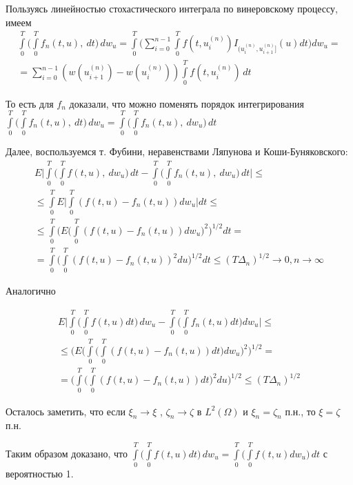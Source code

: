 \documentclass[12pt]{article}
\begin{document}
Пользуясь линейностью стохастического интеграла по винеровскому процессу, имеем
\begin{multline}
\int\limits_0^T \Biggl( \int\limits_0^T f_n(t,u) ,\  dt \biggr) \, dw_u  = \int\limits_0^T \Biggl( \sum \limits _{i=0}^{n-1}  \int\limits_0^T f(t,u_i^{(n)})I_{(u_i^{(n)},u_{i+1}^{(n)}]}(u) dt \Biggr) dw_u=\\
= \sum \limits _{i=0}^{n-1} (w(u_{i+1}^{(n)})-w(u_i^{(n)}))  \int\limits_0^T f(t,u_i^{(n)}) \,dt
\end{multline}

То есть для $f_n$ доказали, что можно поменять порядок интегрирования $\int\limits_0^T \Biggl( \int\limits_0^T f_n(t,u) ,\  dt \biggr) \, dw_u=\int\limits_0^T \Biggl( \int\limits_0^T f_n(t,u) ,\ dw_u \biggr) \, dt $

Далее, воспользуемся т. Фубини, неравенствами Ляпунова и Коши-Буняковского:
\begin{multline}
E \Biggl| \int\limits_0^T \Biggl( \int\limits_0^T f(t,u) ,\ dw_u \Biggr) \, dt - \int\limits_0^T \Biggl( \int\limits_0^T f_n(t,u) ,\ dw_u \Biggr) \, dt \Biggr| \le\\
\le \int\limits_0^T E  \Biggl| \int\limits_0^T (f(t,u)-f_n(t,u)) dw_u \Biggr| dt \le\\
\le  \int\limits_0^T \Biggl(E  \Biggl( \int\limits_0^T (f(t,u)-f_n(t,u)) dw_u \Biggr)^2 \Biggr)^{1/2} dt =\\
=\int\limits_0^T  \Biggl( \int\limits_0^T (f(t,u)-f_n(t,u))^2 du \Biggr)^{1/2} dt \le (T\Delta_n)^{1/2} \to 0 , n \to \infty
\end{multline}

Аналогично

\begin{multline}
E \Biggl| \int\limits_0^T \Biggl( \int\limits_0^T f(t,u) dt  \Biggr) \,  dw_u  - \int\limits_0^T \Biggl( \int\limits_0^T f_n(t,u)  dt  \Biggr) dw_u  \Biggr| \le\\
\le \Biggl( E \Biggl(\int\limits_0^T \Biggl(  \int\limits_0^T (f(t,u)-f_n(t,u)) dt \Biggr) dw_u \Biggr)^2 \Biggr)^{1/2} =\\
=\Biggl( \int\limits_0^T \Biggl( \int\limits_0^T (f(t,u)-f_n(t,u)) dt \Biggr)^2 du \Biggr)^{1/2} \le (T\Delta_n)^{1/2}
\end{multline}

Осталось заметить, что если $\xi_n \to \xi$ , $\zeta_n \to \zeta $ в $L^2(\Omega)$ и $\xi_n=\zeta_n$ п.н., то $\xi=\zeta$ п.н. 

Таким образом доказано, что $\int\limits_0^T \Biggl( \int\limits_0^T f(t,u)   dt \biggr) \, dw_u=\int\limits_0^T \Biggl( \int\limits_0^T f(t,u)  dw_u \biggr) \, dt $ с вероятностью 1.
\end{document}
